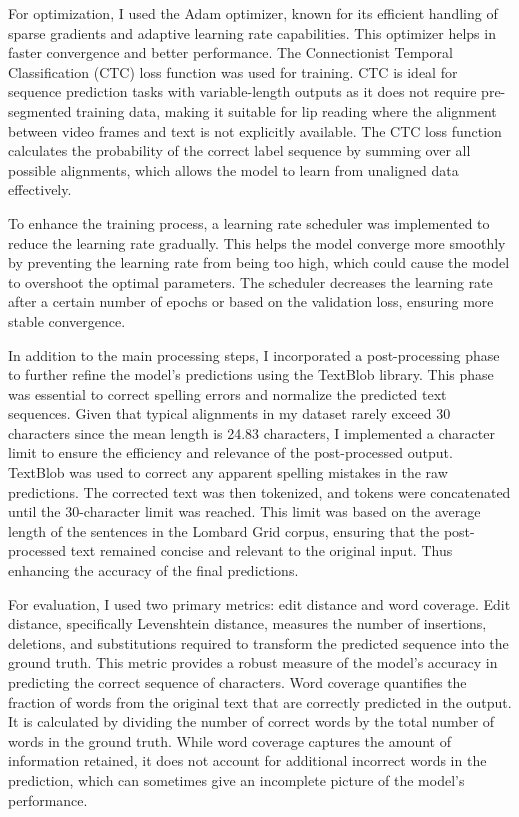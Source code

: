 \documentclass[
]{article}
\begin{document}
For optimization, I used the Adam optimizer, known for its efficient
handling of sparse gradients and adaptive learning rate capabilities.
This optimizer helps in faster convergence and better performance. The
Connectionist Temporal Classification (CTC) loss function was used for
training. CTC is ideal for sequence prediction tasks with
variable-length outputs as it does not require pre-segmented training
data, making it suitable for lip reading where the alignment between
video frames and text is not explicitly available. The CTC loss function
calculates the probability of the correct label sequence by summing over
all possible alignments, which allows the model to learn from unaligned
data effectively.

To enhance the training process, a learning rate scheduler was
implemented to reduce the learning rate gradually. This helps the model
converge more smoothly by preventing the learning rate from being too
high, which could cause the model to overshoot the optimal parameters.
The scheduler decreases the learning rate after a certain number of
epochs or based on the validation loss, ensuring more stable
convergence.

In addition to the main processing steps, I incorporated a
post-processing phase to further refine the model's predictions using
the TextBlob library. This phase was essential to correct spelling
errors and normalize the predicted text sequences. Given that typical
alignments in my dataset rarely exceed 30 characters since the mean
length is 24.83 characters, I implemented a character limit to ensure
the efficiency and relevance of the post-processed output. TextBlob was
used to correct any apparent spelling mistakes in the raw predictions.
The corrected text was then tokenized, and tokens were concatenated
until the 30-character limit was reached. This limit was based on the
average length of the sentences in the Lombard Grid corpus, ensuring
that the post-processed text remained concise and relevant to the
original input. Thus enhancing the accuracy of the final predictions.

For evaluation, I used two primary metrics: edit distance and word
coverage. Edit distance, specifically Levenshtein distance, measures the
number of insertions, deletions, and substitutions required to transform
the predicted sequence into the ground truth. This metric provides a
robust measure of the model's accuracy in predicting the correct
sequence of characters. Word coverage quantifies the fraction of words
from the original text that are correctly predicted in the output. It is
calculated by dividing the number of correct words by the total number
of words in the ground truth. While word coverage captures the amount of
information retained, it does not account for additional incorrect words
in the prediction, which can sometimes give an incomplete picture of the
model's performance.
\end{document}
